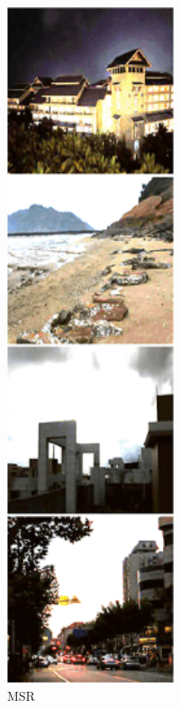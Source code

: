 \documentclass[CJK,aspectratio=169]{beamer}  %
\begin{document}
\begin{frame}
\begin{figure}
\begin{minipage}{.08\paperwidth}
			\label{fig: MSR}	
			\caption*{\tiny MSR}
		\end{minipage}
		\begin{minipage}{.08\paperwidth}
			\centering
			\setlength{\abovecaptionskip}{-0.45cm}
			\includegraphics[width=\linewidth]{picture/LLIE/LightingNet/RUAS}

\end{minipage}
\end{figure}
\end{frame}
\end{document}
